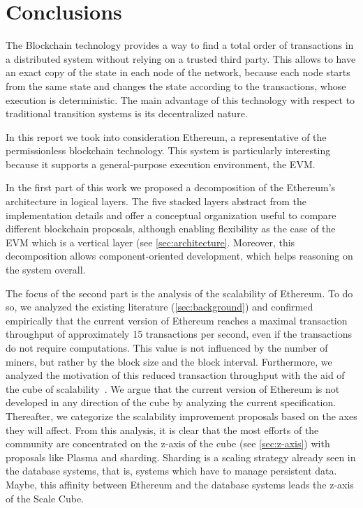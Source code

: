 \section{Conclusions}
\label{sec:conclusions}
The Blockchain technology provides a way to find a total order of transactions
in a distributed system without relying on a trusted third party. This allows
to have an exact copy of the state in each node of the network, because each
node starts from the same state and changes the state according to the
transactions, whose execution is deterministic. The main advantage of this
technology with respect to traditional transition systems is its decentralized
nature.

In this report we took into consideration Ethereum, a representative of the
permissionless blockchain technology. This system is particularly interesting
because it supports a general-purpose execution environment, the EVM.

In the first part of this work we proposed a decomposition of the Ethereum's
architecture in logical layers. The five stacked layers abstract from the
implementation details and offer a conceptual organization useful to compare
different blockchain proposals, although enabling flexibility as the case of the
EVM which is a vertical layer (see \autoref{sec:architecture}. Moreover, this
decomposition allows component-oriented development, which helps reasoning on the
system overall.

The focus of the second part is the analysis of the scalability of Ethereum. To
do so, we analyzed the existing literature (\autoref{sec:background}) and
confirmed empirically that the current version of Ethereum reaches a maximal
transaction throughput of approximately 15 transactions per second, even if the
transactions do not require computations. This value is not influenced by the
number of miners, but rather by the block size and the block interval.
Furthermore, we analyzed the motivation of this reduced transaction throughput
with the aid of the cube of scalability~\cite{bib:art-of-scalability}. We argue
that the current version of Ethereum is not developed in any direction of the
cube by analyzing the current specification. Thereafter, we categorize the
scalability improvement proposals based on the axes they will affect. From this
analysis, it is clear that the most efforts of the community are concentrated on
the z-axis of the cube (see \autoref{sec:z-axis}) with proposals like Plasma and
sharding. Sharding is a scaling strategy already seen in the database systems,
that is, systems which have to manage persistent data. Maybe, this affinity
between Ethereum and the database systems leads the z-axis of the Scale Cube.

